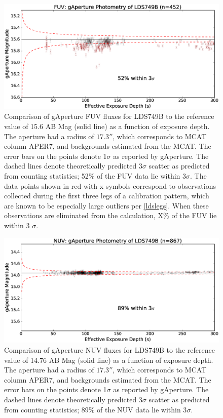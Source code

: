 \documentclass[preprint]{aastex}
\begin{document}
\begin{figure}
\includegraphics[scale=0.625]{Fig09.eps}
\caption{Comparison of gAperture FUV fluxes for LDS749B to the reference value of 15.6 AB Mag (solid line) as a function of exposure depth. The aperture had a radius of $17.3''$, which corresponds to MCAT column APER7, and backgrounds estimated from the MCAT. The error bars on the points denote 1$\sigma$ as reported by gAperture. The dashed lines denote theoretically predicted 3$\sigma$ scatter as predicted from counting statistics; 52\% of the FUV data lie within 3$\sigma$. The data points shown in red with x symbols correspond to observations collected during the first three legs of a calibration pattern, which are known to be especially large outliers per \ref{ldslegs}. When these observations are eliminated from the calculation, X\% of the FUV lie within 3 $\sigma$.
\label{ldsabsphotfuv}}
\end{figure}


\begin{figure}
\includegraphics[scale=0.625]{Fig10.eps}
\caption{Comparison of gAperture NUV fluxes for LDS749B to the reference value of 14.76 AB Mag (solid line) as a function of exposure depth. The aperture had a radius of $17.3''$, which corresponds to MCAT column APER7, and backgrounds estimated from the MCAT. The error bars on the points denote 1$\sigma$ as reported by gAperture. The dashed lines denote theoretically predicted 3$\sigma$ scatter as predicted from counting statistics; 89\% of the NUV data lie within 3$\sigma$.
\label{ldsabsphotnuv}}
\end{figure}
\end{document}
